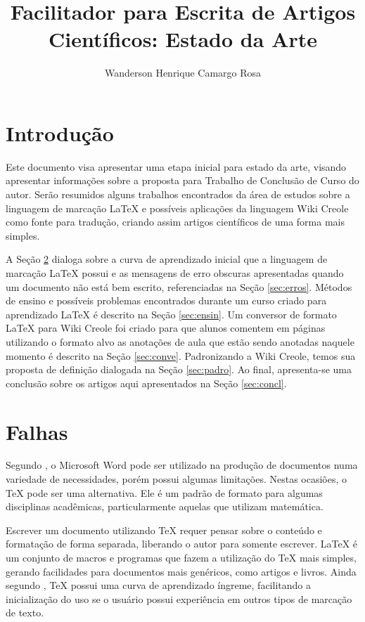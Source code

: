 \documentclass{article}
\title{Facilitador para Escrita de Artigos Científicos: Estado da Arte}
\author{Wanderson Henrique Camargo Rosa\inst{1}}
\begin{document}
\maketitle{}

\section{Introdução}
\label{sec:intro}

Este documento visa apresentar uma etapa inicial para estado da arte, visando
apresentar informações sobre a proposta para Trabalho de Conclusão de Curso do
autor. Serão resumidos alguns trabalhos encontrados da área de estudos sobre a
linguagem de marcação \LaTeX{} e possíveis aplicações da linguagem Wiki Creole
como fonte para tradução, criando assim artigos científicos de uma forma mais
simples.

A Seção \ref{sec:falha} dialoga sobre a curva de aprendizado inicial que a
linguagem de marcação \LaTeX{} possui e as mensagens de erro obscuras
apresentadas quando um documento não está bem escrito, referenciadas na Seção
\ref{sec:erros}. Métodos de ensino e possíveis problemas encontrados durante um
curso criado para aprendizado \LaTeX{} é descrito na Seção \ref{sec:ensin}. Um
conversor de formato \LaTeX{} para Wiki Creole foi criado para que alunos
comentem em páginas utilizando o formato alvo as anotações de aula que estão
sendo anotadas naquele momento é descrito na Seção \ref{sec:conve}. Padronizando
a Wiki Creole, temos sua proposta de definição dialogada na Seção
\ref{sec:padro}. Ao final, apresenta-se uma conclusão sobre os artigos aqui
apresentados na Seção \ref{sec:concl}.

\section{Falhas}
\label{sec:falha}

Segundo \cite{salzberg2005}, o Microsoft Word\texttrademark{} pode ser utilizado
na produção de documentos numa variedade de necessidades, porém possui algumas
limitações. Nestas ocasiões, o \TeX{} pode ser uma alternativa. Ele é um padrão
de formato para algumas disciplinas acadêmicas, particularmente aquelas que
utilizam matemática.

Escrever um documento utilizando \TeX{} requer pensar sobre o conteúdo e
formatação de forma separada, liberando o autor para somente escrever. \LaTeX{}
é um conjunto de macros e programas que fazem a utilização do \TeX{} mais
simples, gerando facilidades para documentos mais genéricos, como artigos e
livros. Ainda segundo \cite{salzberg2005}, \TeX{} possui uma curva de
aprendizado íngreme, facilitando a inicialização do uso se o usuário possui
experiência em outros tipos de marcação de texto.
\end{document}

